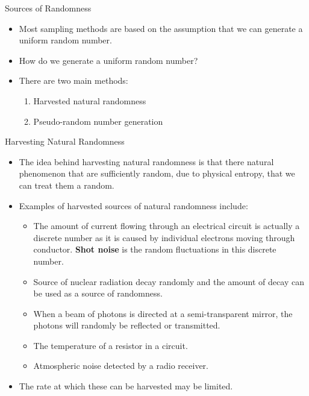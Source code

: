 \documentclass[serif,xcolor=pdftex,dvipsnames,table,hyperref={bookmarks=false,breaklinks}]{beamer}
\begin{document}
\begin{frame}[t]{Sources of Randomness}
	\begin{itemize}[<+->]
		\item Most sampling methods are based on the assumption that we can generate a uniform random number.
		\item How do we generate a uniform random number?
		\item There are two main methods:
		\begin{enumerate}[<+->]
			\item Harvested natural randomness
			\item Pseudo-random number generation
		\end{enumerate}
	\end{itemize}
\end{frame}

\begin{frame}[t]{Harvesting Natural Randomness}
	\begin{itemize}[<+->]
		\item The idea behind harvesting natural randomness is that there natural phenomenon that are sufficiently random, due to physical entropy, that we can treat them a random.
		\item Examples of harvested sources of natural randomness include:
		\begin{itemize}[<+->]
			\item The amount of current flowing through an electrical circuit is actually a discrete number as it is caused by individual electrons moving through conductor. \textbf{Shot noise} is the random fluctuations in this discrete number.
			\item Source of nuclear radiation decay randomly and the amount of decay can be used as a source of randomness.
			\item When a beam of photons is directed at a semi-transparent mirror, the photons will randomly be reflected or transmitted.
			\item The temperature of a resistor in a circuit.
			\item Atmospheric noise detected by a radio receiver.
		\end{itemize}
		\item The rate at which these can be harvested may be limited.
	\end{itemize}
\end{frame}
\end{document}
